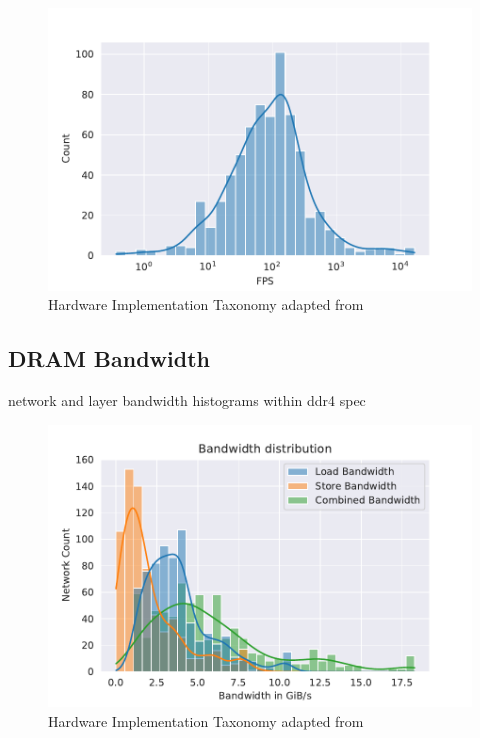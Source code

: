 \begin{figure}[ht]
    \centering
    \includegraphics[scale=0.58]{Plots/latency/fps.pdf}
    \caption{Hardware Implementation Taxonomy adapted from \cite{maestro}}
    \label{fig:hw_taxonomy}
\end{figure}



\subsection{DRAM Bandwidth}
\label{chap:hero:sim_platform:cigar_side}

network and layer bandwidth histograms
within ddr4 spec

\begin{figure}[ht]
    \centering
    \includegraphics[scale=0.58]{Plots/resources/net_bw.pdf}
    \caption{Hardware Implementation Taxonomy adapted from \cite{maestro}}
    \label{fig:hw_taxonomy}
\end{figure}


